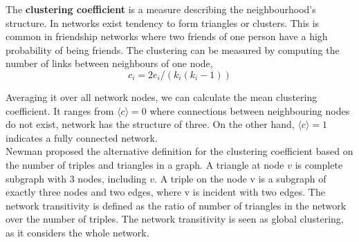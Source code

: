 The \textbf{clustering coefficient} is a measure describing the neighbourhood's structure. In networks exist tendency to form triangles or clusters. This is common in friendship networks where two friends of one person have a high probability of being friends. The clustering can be measured by computing the number of links between neighbours of one node,
\begin{equation}
c_i=2e_i/(k_i(k_i-1))
\end{equation}

Averaging it over all network nodes, we can calculate the mean clustering coefficient. It ranges from  $\langle c \rangle = 0$ where connections between neighbouring nodes do not exist, network has the structure of three. On the other hand, $\langle c \rangle = 1$ indicates a fully connected network. \\

Newman proposed the alternative definition for the clustering coefficient based on the number of triples and triangles in a graph. A triangle at node $v$ is complete subgraph with 3 nodes, including $v$. A triple on the node v is a subgraph of exactly three nodes and two edges, where v is incident with two edges. The network transitivity is defined as the ratio of number of triangles in the network over the number of triples. The network transitivity is seen as global clustering, as it considers the whole network.  




